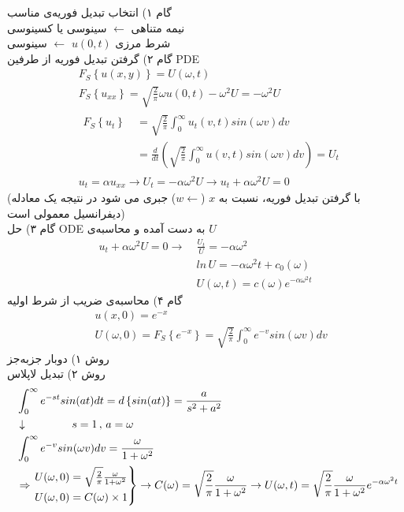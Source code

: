 گام ۱) انتخاب تبدیل فوریه‌ی مناسب\\
نیمه متناهی
$\longleftarrow$
سینوسی یا کسینوسی\\
شرط مرزی 
$u(0,t)$
$\longleftarrow$
سینوسی\\
گام ۲) گرفتن تبدیل فوریه از طرفین PDE
\begin{equation*}
	\begin{aligned}
		&\
		F_S\left\{u(x,y)\right\}=U(\omega,t)
		\\ &\
		F_S\left\{u_{xx}\right\}=\sqrt{\frac2\pi}\omega u(0,t)-\omega^2U=-\omega^2U
		\\ &\
		\begin{aligned}
			F_S\left\{u_t\right\}&\ =\sqrt{\frac2\pi}\int_0^\infty u_t(v,t)sin(\omega v)dv
			\\ &\
			=\frac d{dt}\left(
			\sqrt{\frac2\pi}\int_0^\infty u(v,t)sin(\omega v)dv
			\right)=U_t
		\end{aligned}
		\\ &\
		u_t=\alpha u_{xx}\rightarrow U_t=-\alpha\omega^2U\rightarrow
		u_t+\alpha\omega^2U=0
	\end{aligned}
\end{equation*}
(با گرفتن تبدیل فوریه، نسبت به
$x$
($
w\leftarrow
$)
جبری می شود در نتیجه یک معادله دیفرانسیل معمولی است)\\
گام ۳) حل ODE به دست آمده و محاسبه‌ی $U$
\begin{equation}
	\begin{aligned}
		u_t+\alpha\omega^2U=0\longrightarrow &\
		\frac{U_t}{U}=-\alpha\omega^2
		\\ &\
		ln\, U =-\alpha\omega^2t+c_0(\omega)
		\\ &\
		U(\omega,t)=c(\omega)e^{-\alpha\omega^2t}
	\end{aligned}
\end{equation}
گام ۴) محاسبه‌ی ضریب از شرط اولیه
\begin{equation*}
	\begin{aligned}
		&\
		u(x,0)=e^{-x}
		\\ &\
		U(\omega,0)=F_S\left\{e^{-x}\right\}=
		\sqrt{\frac2\pi}\int_0^\infty e^{-v}sin(\omega v)dv
	\end{aligned}
\end{equation*}
روش ۱) دو‌بار جز‌به‌جز\\
روش ۲) تبدیل لاپلاس
\begin{equation*}
	\begin{aligned}
		&\
		\int_0^\infty e^{-st}sin(at)dt=d\left\{sin(at)\right\}=\frac a{s^2+a^2}
		\\ &\
		\downarrow \qquad \qquad s=1\, , \, a=\omega
		\\ &\
		\int_0^\infty e^{-v}sin(\omega v)dv=\frac\omega{1+\omega^2}
		\\ &\
		\Rightarrow
		\begin{rcases}
			U(\omega,0)=\sqrt{\frac2\pi}\frac\omega{1+\omega^2}
			\\
			U(\omega,0)=C(\omega)\times1
		\end{rcases}
	\rightarrow
	C(\omega)=\sqrt{\frac2\pi}\frac\omega{1+\omega^2}\rightarrow U(\omega,t)=\sqrt{\frac2\pi}\frac\omega{1+\omega^2}e^{-\alpha\omega^2t}
	\end{aligned}
\end{equation*}
